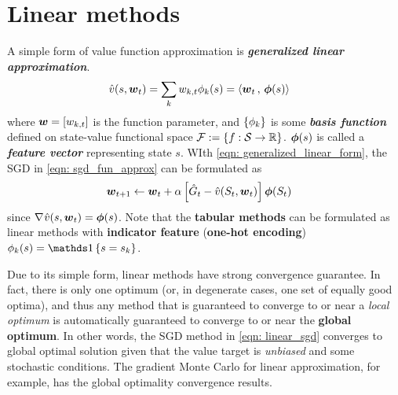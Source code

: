 \documentclass[11pt]{article}
\begin{document}
\section{Linear methods}
A simple form of value function approximation is \emph{\textbf{generalized linear approximation}}.
\begin{align}
\hat{v}(s, \boldsymbol{w}_{t}) &= \sum_{k}w_{k,t} \phi_{k}(s) = \left\langle  \boldsymbol{w}_{t}\,,\, \boldsymbol{\phi}(s) \right\rangle \label{eqn: generalized_linear_form}
\end{align} where $\boldsymbol{w} = [w_{k,t}]$ is the function parameter, and $\left\{\phi_{k}\right\}$ is some \emph{\textbf{basis function}} defined on state-value functional space  ${\mathcal F}:=\left\{f: {\mathcal S} \rightarrow {\mathbb R}\right\}$. $\boldsymbol{\phi}(s)$ is called a \textbf{\emph{feature vector}} representing state $s$. WIth \eqref{eqn: generalized_linear_form}, the SGD in \eqref{eqn: sgd_fun_approx} can be formulated as
\begin{align}
\boldsymbol{w}_{t+1} &\leftarrow  \boldsymbol{w}_{t} + \alpha \left[\hat{G}_{t} - \hat{v}(S_{t}, \boldsymbol{w}_{t})\right] \boldsymbol{\phi}(S_{t}) \label{eqn: linear_sgd}
\end{align} since $\nabla_{}{\hat{v}(s, \boldsymbol{w}_{t})} = \boldsymbol{\phi}(s)$.  Note that the \textbf{tabular methods} can be formulated as linear methods with \textbf{indicator feature} (\textbf{one-hot encoding}) $\phi_{k}(s) = \ind{s = s_{k}}$. 

Due to its simple form, linear methods have strong convergence guarantee. In fact, there is only one optimum (or, in degenerate cases, one set of equally good optima), and thus any method that is guaranteed to converge to or near a \emph{local optimum} is automatically guaranteed to converge to or near the \textbf{global optimum}. In other words, the SGD method in \eqref{eqn: linear_sgd} converges to global optimal solution given that the value target is \emph{unbiased} and some stochastic conditions. The gradient Monte Carlo for linear approximation, for example, has the global optimality convergence results.  
\end{document}
